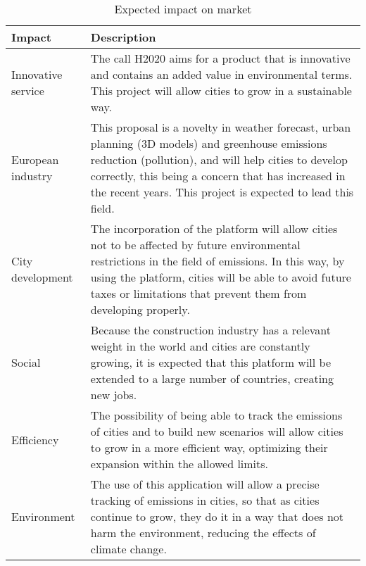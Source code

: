\begin{table}[H]
	\centering
	\begin{tabular}{l p{11cm}}
		
		\toprule[2pt]
		
		\textbf{Impact} &  \textbf{Description}\\
		
		\midrule [1.5pt]
		
		Innovative service & The call H2020 aims for a product that is innovative and contains an added value in environmental terms. This project will allow cities to grow in a sustainable way.\vspace{0.2cm}\\
		
		\midrule
		
		European industry & This proposal is a novelty in weather forecast, urban planning (3D models) and greenhouse emissions reduction (pollution), and will help cities to develop correctly, this being a concern that has increased in the recent years. This project is expected to lead this field.\vspace{0.2cm}\\
		
		\midrule
		
		City development & The incorporation of the platform will allow cities not to be affected by future environmental restrictions in the field of emissions. In this way, by using the platform, cities will be able to avoid future taxes or limitations that prevent them from developing properly.\vspace{0.2cm}\\
		
		\midrule
		
		Social & Because the construction industry has a relevant weight in the world and cities are constantly growing, it is expected that this platform will be extended to a large number of countries, creating new jobs.\vspace{0.2cm}\\
		
		\midrule
		
		Efficiency & The possibility of being able to track the emissions of cities and to build new scenarios will allow cities to grow in a more efficient way, optimizing their expansion within the allowed limits.\vspace{0.2cm}\\
		
		\midrule
		
		Environment & The use of this application will allow a precise tracking of emissions in cities, so that as cities continue to grow, they do it in a way that does not harm the environment, reducing the effects of climate change.\vspace{0.2cm}\\
		
		\bottomrule[2pt]
		
	\end{tabular}
	\caption{Expected impact on market}
\end{table}


